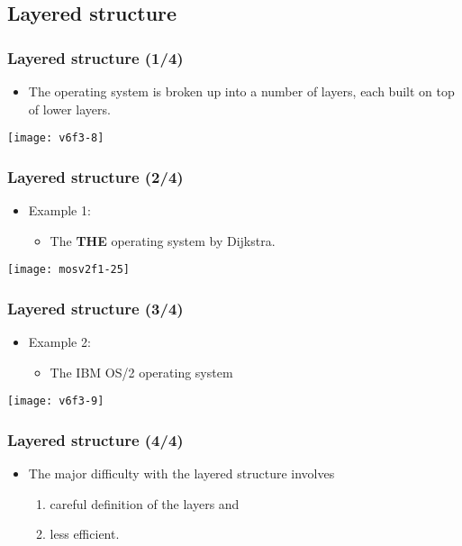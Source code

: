 \documentclass[CJKutf8,xcolor=pdftex,dvipsnames,table]{beamer}
\begin{document}
\begin{CJK*}{UTF8}{song}
  \subsection{Layered structure}

  \begin{frame}
    \frametitle{Layered structure (1/4)} \pause
    \begin{itemize}
    \item{The operating system is broken up into a number of layers, each built on top of lower layers.} \pause
    \end{itemize}
    \begin{center}
      \texttt{[image: v6f3-8]}
    \end{center}
  \end{frame}

  \begin{frame}
    \frametitle{Layered structure (2/4)} \pause
    \begin{itemize}
    \item{Example 1:} \pause
      \begin{itemize}
      \item{The \textbf{THE} operating system by Dijkstra.}
      \end{itemize}
    \end{itemize}
    \begin{center}
      \texttt{[image: mosv2f1-25]}
    \end{center}
  \end{frame}

  \begin{frame}
    \frametitle{Layered structure (3/4)} \pause
    \begin{itemize}
    \item{Example 2:} \pause
      \begin{itemize}
      \item{The IBM OS/2 operating system} \pause
      \end{itemize}
    \end{itemize}
    \begin{center}
      \texttt{[image: v6f3-9]}
    \end{center}
  \end{frame}
  
  \begin{frame}
    \frametitle{Layered structure (4/4)} \pause
    \begin{itemize}
    \item{The major difficulty with the layered structure involves} \pause
      \begin{enumerate}
      \item{careful definition of the layers and} \pause
      \item{less efficient.}
      \end{enumerate}
    \end{itemize}
  \end{frame}
  

\end{CJK*}
\end{document}
